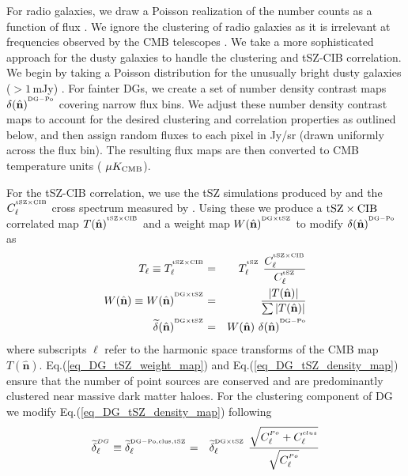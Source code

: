 For radio galaxies, we draw a Poisson realization of the number counts as a function of flux \citep{dezotti05}. We ignore the clustering of radio galaxies as it is irrelevant at frequencies observed by the CMB telescopes \citep{dezotti05, george15}. We take a more sophisticated approach for the dusty galaxies to handle the clustering and tSZ-CIB correlation. We begin by taking a Poisson distribution for the unusually bright dusty galaxies ($>1$\,mJy) \citep{bethermin11} . For fainter DGs, we create a set of number density contrast maps $\delta(\hat{\textbf{n}})^{^{\rm DG-Po}}$ covering narrow flux bins. We adjust these number density contrast maps to account for the desired clustering and correlation properties as outlined below, and then assign random fluxes to each pixel in Jy/sr (drawn uniformly across the flux bin). The resulting flux maps are then converted to CMB temperature units ($\ \mu K_{\rm CMB}$). 

For the tSZ-CIB correlation, we use the tSZ simulations produced by \cite{mccarthy13} and the $C_{\ell}^{^{\rm tSZ \times CIB}}$ cross spectrum measured by \citet{george15}. Using these we produce a $\rm tSZ \times CIB$ correlated map $T(\hat{\textbf{n}})^{^{\rm tSZ \times CIB}}$ and a weight map $W(\hat{\textbf{n}})^{^{\rm DG \times tSZ}}$ to modify $\delta(\hat{\textbf{n}})^{^{\rm DG-Po}}$ as
\begin{eqnarray}
T_{\ell} \equiv T_{\ell}^{^{\rm tSZ \times CIB}} & = & T_{\ell}^{^{\rm tSZ}}\ \frac{C_{\ell}^{^{\rm tSZ \times CIB}}}{C_{\ell}^{^{\rm tSZ}}}\\
\label{eq_DG_tSZ_weight_map}
W(\hat{\textbf{n}}) \equiv W(\hat{\textbf{n}})^{^{\rm DG \times tSZ}} & = & \frac{\left| T(\hat{\textbf{n}}) \right|}{\sum{\left|T(\hat{\textbf{n}})\right|}}\\
\label{eq_DG_tSZ_density_map}
\widetilde{\delta}(\hat{\textbf{n}})^{^{\rm DG \times tSZ}} & = & W(\hat{\textbf{n}})\ \delta(\hat{\textbf{n}})^{^{\rm DG-Po}}
\end{eqnarray} where subscripts $\ell$ refer to the harmonic space transforms of the CMB map $T(\hat{\textbf{n}})$. Eq.(\ref{eq_DG_tSZ_weight_map}) and Eq.(\ref{eq_DG_tSZ_density_map}) ensure that the number of point sources are conserved and are predominantly clustered near massive dark matter haloes. For the clustering component of DG we modify Eq.(\ref{eq_DG_tSZ_density_map}) following \cite{gonzo04}
\begin{eqnarray}
\widetilde{\delta}_{\ell}^{^{DG}} \equiv \widetilde{\delta}_{\ell}^{^{\rm DG-Po, clus, tSZ}} & = & \widetilde{\delta}_{\ell}^{^{\rm DG \times tSZ}}\ \frac{ \sqrt{ C_{\ell}^{^{Po}} + C_{\ell}^{^{clus}}} } { \sqrt{ C_{\ell}^{^{Po}} } }
\end{eqnarray}